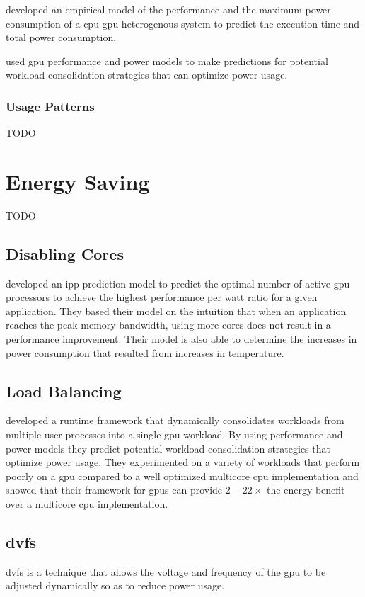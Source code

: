 				\textcite{Komoda2013} developed an empirical model of the performance and the maximum power consumption of a \gls{cpu}-\gls{gpu} heterogenous system to predict the execution time and total power consumption.

				\textcite{Li2011} used \gls{gpu} performance and power models to make predictions for potential workload consolidation strategies that can optimize power usage.

			\subsubsection{Usage Patterns}
				TODO

	\section{Energy Saving}
		TODO

		\subsection{Disabling Cores}
			\textcite{Hong2010} developed an \gls{ipp} prediction model to predict the optimal number of active \gls{gpu} processors to achieve the highest performance per watt ratio for a given application.
			They based their model on the intuition that when an application reaches the peak memory bandwidth, using more cores does not result in a performance improvement.
			Their model is also able to determine the increases in power consumption that resulted from increases in temperature.
		
		\subsection{Load Balancing}
			\textcite{Li2011} developed a runtime framework that dynamically consolidates workloads from multiple user processes into a single \gls{gpu} workload.
			By using performance and power models they predict potential workload consolidation strategies that optimize power usage.
			They experimented on a variety of workloads that perform poorly on a \gls{gpu} compared to a well optimized multicore \gls{cpu} implementation and showed that their framework for \glspl{gpu} can provide $2-22 \times$ the energy benefit over a multicore \gls{cpu} implementation.

		\subsection{\acrlong{dvfs}}
			\gls{dvfs} is a technique that allows the voltage and frequency of the \gls{gpu} to be adjusted dynamically so as to reduce power usage.

